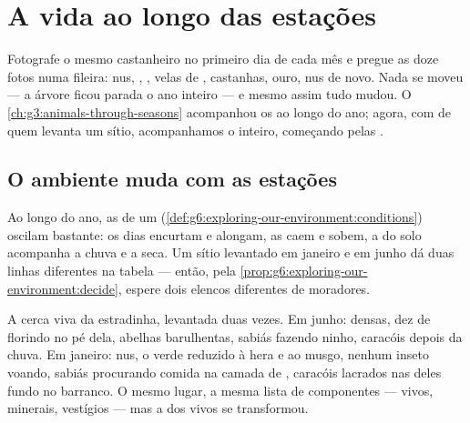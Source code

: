 \chapter{A vida ao longo das estações}\label{ch:g6:life-through-seasons}

Fotografe o mesmo castanheiro no primeiro dia de cada mês e pregue as
doze fotos numa fileira:  nus, , , velas de ,
castanhas, ouro,  nus de novo. Nada se moveu --- a árvore ficou
parada o ano inteiro --- e mesmo assim tudo mudou. O
\cref{ch:g3:animals-through-seasons} acompanhou os  ao longo
do ano; agora, com  de quem levanta um sítio, acompanhamos o
 inteiro, começando pelas .

\section{O ambiente muda com as estações}

\begin{proposition}\label{prop:g6:life-through-seasons:conditions}
Ao longo do ano, as  de um 
(\cref{def:g6:exploring-our-environment:conditions}) oscilam bastante:
os dias encurtam e alongam, as  caem e sobem, a 
do solo acompanha a chuva e a seca. Um sítio levantado em janeiro e
em junho dá duas linhas diferentes na tabela --- então, pela
\cref{prop:g6:exploring-our-environment:decide}, espere dois elencos
diferentes de moradores.
\end{proposition}
\admitted

\begin{example}\label{ex:g6:life-through-seasons:hedge}
A cerca viva da estradinha, levantada duas vezes. Em junho: 
densas, dez  de  florindo no pé dela, abelhas
barulhentas, sabiás fazendo ninho, caracóis depois da chuva. Em
janeiro:  nus, o verde reduzido à hera e ao musgo, nenhum
inseto voando, sabiás procurando comida na camada de ,
caracóis lacrados nas  deles fundo no barranco. O mesmo lugar,
a mesma lista de componentes --- vivos, minerais, vestígios --- mas a
 dos vivos se transformou.
\end{example}

